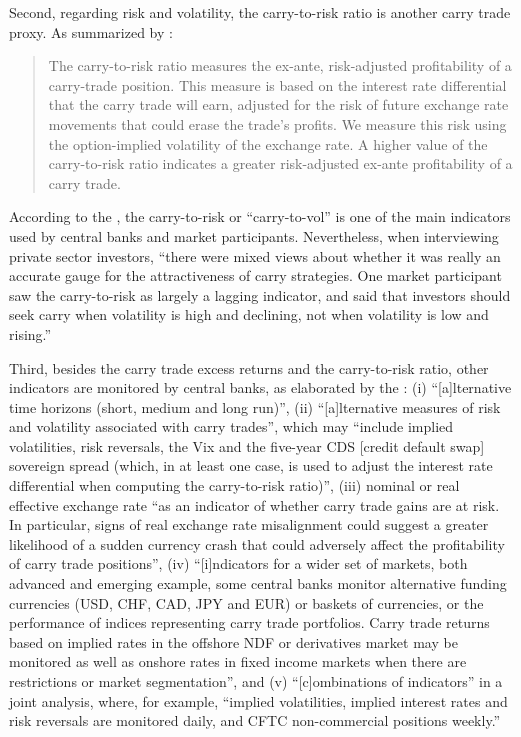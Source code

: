 \documentclass[a4paper, twoside]{templates/ociamthesis}
\begin{document}
Second, regarding risk and volatility, the carry-to-risk ratio is another carry trade proxy. As summarized by \textcite[ 439]{curcuru2011}:

\begin{quote}
The carry-to-risk ratio measures the ex-ante, risk-adjusted profitability of a carry-trade position. This measure is based on the interest rate differential that the carry trade will earn, adjusted for the risk of future exchange rate movements that could erase the trade's profits. We measure this risk using the option-implied volatility of the exchange rate. A higher value of the carry-to-risk ratio indicates a greater risk-adjusted ex-ante profitability of a carry trade.
\end{quote}

According to the \textcite[ 20]{bankforinternationalsettlements2015}, the carry-to-risk or ``carry-to-vol'' is one of the main indicators used by central banks and market participants. Nevertheless, when interviewing private sector investors, ``there were mixed views about whether it was really an accurate gauge for the attractiveness of carry strategies. One market participant saw the carry-to-risk as largely a lagging indicator, and said that investors should seek carry when volatility is high and declining, not when volatility is low and rising.'' \autocite[ 20]{bankforinternationalsettlements2015}

Third, besides the carry trade excess returns and the carry-to-risk ratio, other indicators are monitored by central banks, as elaborated by the \textcite[ 20-21]{bankforinternationalsettlements2015}: (i) ``{[}a{]}lternative time horizons (short, medium and long run)'', (ii) ``{[}a{]}lternative measures of risk and volatility associated with carry trades'', which may ``include implied volatilities, risk reversals, the Vix and the five-year CDS {[}credit default swap{]} sovereign spread (which, in at least one case, is used to adjust the interest rate differential when computing the carry-to-risk ratio)'', (iii) nominal or real effective exchange rate ``as an indicator of whether carry trade gains are at risk. In particular, signs of real exchange rate misalignment could suggest a greater likelihood of a sudden currency crash that could adversely affect the profitability of carry trade positions'', (iv) ``{[}i{]}ndicators for a wider set of markets, both advanced and emerging example, some central banks monitor alternative funding currencies (USD, CHF, CAD, JPY and EUR) or baskets of currencies, or the performance of indices representing carry trade portfolios. Carry trade returns based on implied rates in the offshore NDF or derivatives market may be monitored as well as onshore rates in fixed income markets when there are restrictions or market segmentation'', and (v) ``{[}c{]}ombinations of indicators'' in a joint analysis, where, for example, ``implied volatilities, implied interest rates and risk reversals are monitored daily, and CFTC non-commercial positions weekly.''
\end{document}
